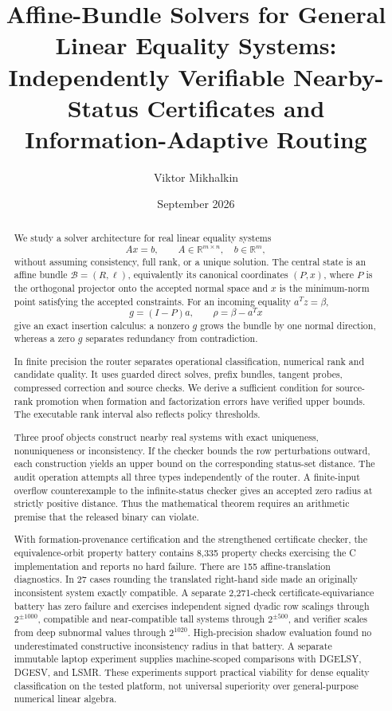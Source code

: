 \documentclass[11pt]{article}
\title{Affine-Bundle Solvers for General Linear Equality Systems:\\
Independently Verifiable Nearby-Status Certificates and Information-Adaptive Routing}
\author{Viktor Mikhalkin}
\date{September 2026}
\theoremstyle{definition}
\newcommand{\R}{\mathbb{R}}
\newcommand{\Bun}{\mathcal{B}}
\begin{document}
\maketitle

\begin{abstract}
We study a solver architecture for real linear equality systems
\[
Ax=b,\qquad A\in\R^{m\times n},\quad b\in\R^m,
\]
without assuming consistency, full rank, or a unique solution. The central state is an affine bundle
\(\Bun=(R,\ell)\), equivalently its canonical coordinates \((P,x)\), where \(P\) is the orthogonal projector onto the accepted normal space and \(x\) is the minimum-norm point satisfying the accepted constraints. For an incoming equality \(a^Tz=\beta\),
\[
g=(I-P)a,\qquad \rho=\beta-a^Tx
\]
give an exact insertion calculus: a nonzero \(g\) grows the bundle by one normal direction, whereas a zero \(g\) separates redundancy from contradiction.

In finite precision the router separates operational classification, numerical rank and candidate quality. It uses guarded direct solves, prefix bundles, tangent probes, compressed correction and source checks. We derive a sufficient condition for source-rank promotion when formation and factorization errors have verified upper bounds. The executable rank interval also reflects policy thresholds.

Three proof objects construct nearby real systems with exact uniqueness, nonuniqueness or inconsistency. If the checker bounds the row perturbations outward, each construction yields an upper bound on the corresponding status-set distance. The audit operation attempts all three types independently of the router. A finite-input overflow counterexample to the infinite-status checker gives an accepted zero radius at strictly positive distance. Thus the mathematical theorem requires an arithmetic premise that the released binary can violate.

With formation-provenance certification and the strengthened certificate checker, the equivalence-orbit property battery contains 8,335 property checks exercising the C implementation and reports no hard failure. There are 155 affine-translation diagnostics. In 27 cases rounding the translated right-hand side made an originally inconsistent system exactly compatible. A separate 2,271-check certificate-equivariance battery has zero failure and exercises independent signed dyadic row scalings through $2^{\pm1000}$, compatible and near-compatible tall systems through $2^{\pm500}$, and verifier scales from deep subnormal values through $2^{1020}$. High-precision shadow evaluation found no underestimated constructive inconsistency radius in that battery. A separate immutable laptop experiment supplies machine-scoped comparisons with DGELSY, DGESV, and LSMR. These experiments support practical viability for dense equality classification on the tested platform, not universal superiority over general-purpose numerical linear algebra.
\end{abstract}
\end{document}
